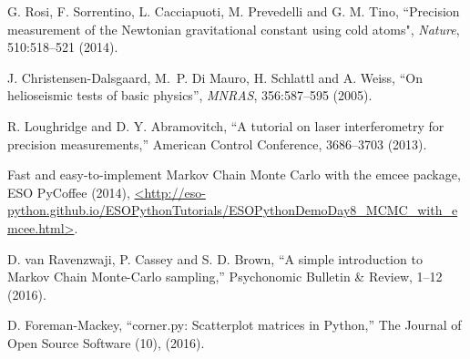 \documentclass[prb,preprint]{revtex4-1}
\begin{document}
\begin{thebibliography}{99}
 G. Rosi, F. Sorrentino, L. Cacciapuoti, M. Prevedelli and G. M. Tino, ``Precision measurement of the Newtonian gravitational constant using cold atoms", \textit{Nature}, 510:518--521 (2014).

 J. Christensen-Dalsgaard, M.~P. Di Mauro,
  H. Schlattl and A. Weiss, ``On helioseismic tests of basic
  physics'', \textit{MNRAS}, 356:587--595 (2005).

 R. Loughridge and D. Y. Abramovitch, ``A tutorial on laser interferometry for precision measurements,'' 
American Control Conference, 3686--3703 (2013). 

 Fast and easy-to-implement Markov Chain Monte Carlo with the emcee package, ESO PyCoffee (2014),
\url{<http://eso-python.github.io/ESOPythonTutorials/ESOPythonDemoDay8_MCMC_with_emcee.html>}.

 D. van Ravenzwaji, P. Cassey and S. D. Brown, ``A simple introduction to Markov Chain Monte-Carlo sampling,'' 
Psychonomic Bulletin {\&} Review, 1--12 (2016). 

 D. Foreman-Mackey, ``corner.py: Scatterplot matrices in Python,'' 
The Journal of Open Source Software (10), (2016).  


\end{thebibliography}
\end{document}
